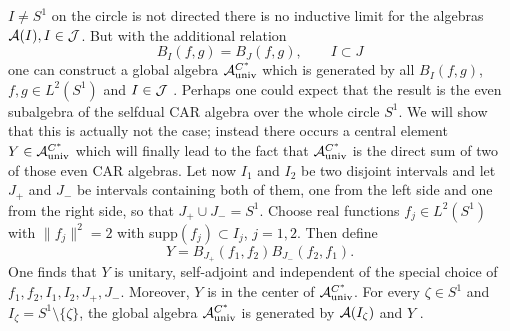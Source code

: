 \documentclass[10pt,a4paper]{article}
\begin{document}
$I\neq S^1$ on the circle is not directed there is no
inductive limit for the algebras ${\cal A}(I),
I\in{\cal J}$. But with the additional relation
\begin{equation}
\label{Bend}
B_I(f,g) = B_J(f,g), \qquad I \subset J
\end{equation}
one can construct a global algebra
${\cal A}_{\rm univ}^{C^*}$ which is
generated by all $B_I(f,g)$, $f,g\in L^2(S^1)$ and
$I\in {\cal J}$ \cite{Szl2,Fred3,ich}.
Perhaps one could expect that the result is the
even subalgebra of the selfdual CAR algebra over
the whole circle $S^1$. We will show that this is
actually not the case; instead there occurs a
central element $Y\in{\cal A}_{\rm univ}^{C^*}$ which
will finally lead to the fact that
${\cal A}_{\rm univ}^{C^*}$ is the direct sum of
two of those even CAR algebras. Let now $I_1$ and $I_2$ be
two disjoint intervals and let $J_+$ and $J_-$ be intervals
containing both of them, one from the left side and one
from the right side, so that $J_+ \cup J_-=S^1$.
Choose real functions $f_j\in L^2(S^1)$ with
$\|f_j\|^2=2$ with supp$(f_j)\subset I_j$, $j=1,2$.
Then define
\begin{equation}
\label{Y}
Y = B_{J_+}(f_1,f_2) B_{J_-}(f_2,f_1).
\end{equation}
One finds that $Y$ is unitary, self-adjoint and independent
of the special choice of $f_1,f_2,I_1,I_2,J_+,J_-$.
Moreover, $Y$ is in the center of ${\cal A}_{\rm univ}^{C^*}$.
For every $\zeta\in S^1$ and $I_\zeta=S^1\setminus
\{\zeta\}$, the global algebra ${\cal A}_{\rm univ}^{C^*}$ is
generated by ${\cal A}(I_\zeta)$ and $Y$
\cite{Szl2,Fred3,ich}.
\end{document}
